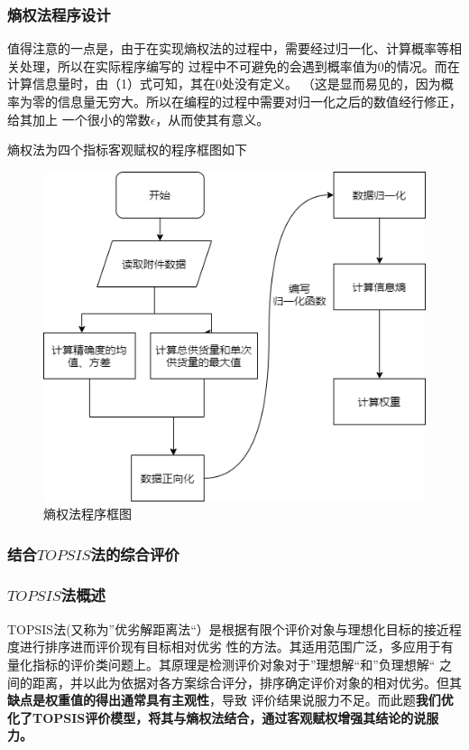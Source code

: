\documentclass[withoutpreface,bwprint]{cumcmthesis}
\begin{document}
\subsubsection*{熵权法程序设计}
值得注意的一点是，由于在实现熵权法的过程中，需要经过归一化、计算概率等相关处理，所以在实际程序编写的
过程中不可避免的会遇到概率值为0的情况。而在计算信息量时，由（1）式可知，其在0处没有定义。
（这是显而易见的，因为概率为零的信息量无穷大。所以在编程的过程中需要对归一化之后的数值经行修正，给其加上
一个很小的常数$\epsilon$\cite{黄鹏2015福建省土地生态安全AHP法和熵值法动态评价比较}，从而使其有意义。\par
熵权法为四个指标客观赋权的程序框图如下
\begin{figure}[H]
    \centering
    \includegraphics[scale=0.6]{shangquan.png}
    \caption{熵权法程序框图}     \label{fig:2}
\end{figure}
\subsubsection{结合$TOPSIS$法的综合评价}
\subsubsection*{$TOPSIS$法概述}
TOPSIS法(又称为”优劣解距离法“）是根据有限个评价对象与理想化目标的接近程度进行排序进而评价现有目标相对优劣
性的方法。其适用范围广泛，多应用于有量化指标的评价类问题上。其原理是检测评价对象对于”理想解“和”负理想解“
之间的距离，并以此为依据对各方案综合评分，排序确定评价对象的相对优劣。但其\textbf{缺点是权重值的得出通常具有主观性}，导致
评价结果说服力不足。而此题\textbf{我们优化了TOPSIS评价模型，将其与熵权法结合，通过客观赋权增强其结论的说服力。}
\end{document}
